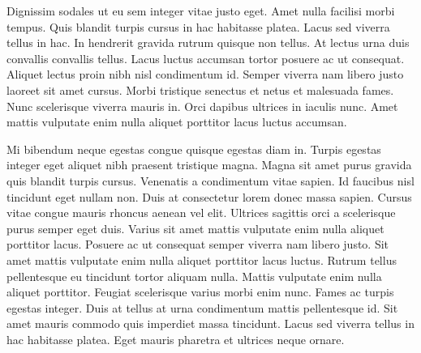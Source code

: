\documentclass{article}
\begin{document}
Dignissim sodales ut eu sem integer vitae justo eget. Amet nulla facilisi morbi tempus. Quis blandit turpis cursus in hac habitasse platea. Lacus sed viverra tellus in hac. In hendrerit gravida rutrum quisque non tellus. At lectus urna duis convallis convallis tellus. Lacus luctus accumsan tortor posuere ac ut consequat. Aliquet lectus proin nibh nisl condimentum id. Semper viverra nam libero justo laoreet sit amet cursus. Morbi tristique senectus et netus et malesuada fames. Nunc scelerisque viverra mauris in. Orci dapibus ultrices in iaculis nunc. Amet mattis vulputate enim nulla aliquet porttitor lacus luctus accumsan.

Mi bibendum neque egestas congue quisque egestas diam in. Turpis egestas integer eget aliquet nibh praesent tristique magna. Magna sit amet purus gravida quis blandit turpis cursus. Venenatis a condimentum vitae sapien. Id faucibus nisl tincidunt eget nullam non. Duis at consectetur lorem donec massa sapien. Cursus vitae congue mauris rhoncus aenean vel elit. Ultrices sagittis orci a scelerisque purus semper eget duis. Varius sit amet mattis vulputate enim nulla aliquet porttitor lacus. Posuere ac ut consequat semper viverra nam libero justo. Sit amet mattis vulputate enim nulla aliquet porttitor lacus luctus. Rutrum tellus pellentesque eu tincidunt tortor aliquam nulla. Mattis vulputate enim nulla aliquet porttitor. Feugiat scelerisque varius morbi enim nunc. Fames ac turpis egestas integer. Duis at tellus at urna condimentum mattis pellentesque id. Sit amet mauris commodo quis imperdiet massa tincidunt. Lacus sed viverra tellus in hac habitasse platea. Eget mauris pharetra et ultrices neque ornare.
\end{document}
